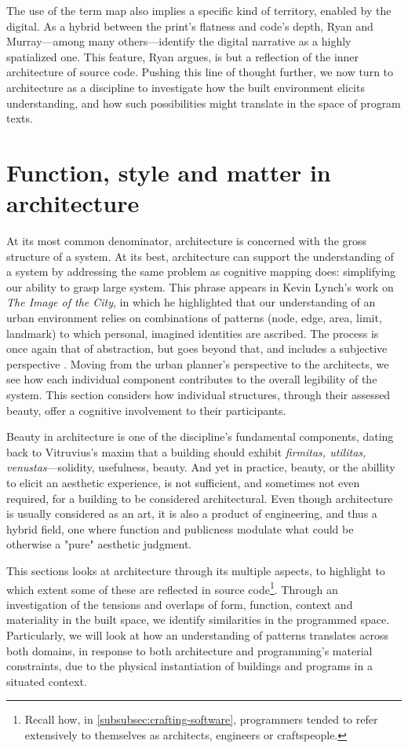 The use of the term map also implies a specific kind of territory, enabled by the digital. As a hybrid between the print's flatness and code's depth, Ryan and Murray—among many others—identify the digital narrative as a highly spatialized one. This feature, Ryan argues, is but a reflection of the inner architecture of source code. Pushing this line of thought further, we now turn to architecture as a discipline to investigate how the built environment elicits understanding, and how such possibilities might translate in the space of program texts.

\section{Function, style and matter in architecture}
\label{sec:arch-understanding}

At its most common denominator, architecture is concerned with the gross structure of a system. At its best, architecture can support the understanding of a system by addressing the same problem as cognitive mapping does: simplifying our ability to grasp large system. This phrase appears in Kevin Lynch's work on \emph{The Image of the City}, in which he highlighted that our understanding of an urban environment relies on combinations of patterns (node, edge, area, limit, landmark) to which personal, imagined identities are ascribed. The process is once again that of abstraction, but goes beyond that, and includes a subjective perspective \citep{lynch_image_1959}. Moving from the urban planner's perspective to the architects, we see how each individual component contributes to the overall legibility of the system. This section considers how individual structures, through their assessed beauty, offer a cognitive involvement to their participants.

Beauty in architecture is one of the discipline's fundamental components, dating back to Vitruvius's maxim that a building should exhibit \emph{firmitas, utilitas, venustas}—solidity, usefulness, beauty. And yet in practice, beauty, or the abillity to elicit an aesthetic experience, is not sufficient, and sometimes not even required, for a building to be considered architectural. Even though architecture is usually considered as an art, it is also a product of engineering, and thus a hybrid field, one where function and publicness modulate what could be otherwise a "pure" aesthetic judgment.

This sections looks at architecture through its multiple aspects, to highlight to which extent some of these are reflected in source code\footnote{Recall how, in \autoref{subsubsec:crafting-software}, programmers tended to refer extensively to themselves as architects, engineers or craftspeople.}. Through an investigation of the tensions and overlaps of form, function, context and materiality in the built space, we identify similarities in the programmed space. Particularly, we will look at how an understanding of patterns translates across both domains, in response to both architecture and programming's material constraints, due to the physical instantiation of buildings and programs in a situated context.

